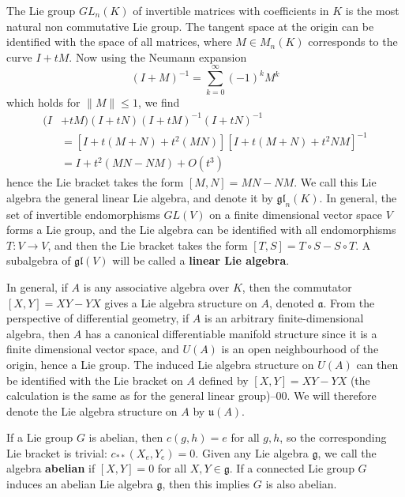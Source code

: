 \begin{example}
    The Lie group $GL_n(K)$ of invertible matrices with coefficients in $K$ is the most natural non commutative Lie group. The tangent space at the origin can be identified with the space of all matrices, where $M \in M_n(K)$ corresponds to the curve $I + tM$. Now using the Neumann expansion
    \[ (I + M)^{-1} = \sum_{k = 0}^\infty (-1)^k M^k \]
    which holds for $\| M \| \leq 1$, we find
    \begin{align*}
        (I& + tM)(I + tN)(I + tM)^{-1}(I + tN)^{-1}\\
        &= [I + t(M + N) + t^2(MN)][I + t(M + N) + t^2NM]^{-1}\\
        &= I + t^2(MN - NM) + O(t^3)
    \end{align*}
    hence the Lie bracket takes the form $[M,N] = MN - NM$. We call this Lie algebra the general linear Lie algebra, and denote it by $\mathfrak{gl}_n(K)$. In general, the set of invertible endomorphisms $GL(V)$ on a finite dimensional vector space $V$ forms a Lie group, and the Lie algebra can be identified with all endomorphisms $T: V \to V$, and then the Lie bracket takes the form $[T,S] = T \circ S - S \circ T$. A subalgebra of $\mathfrak{gl}(V)$ will be called a {\bf linear Lie algebra}.
\end{example}

\begin{example}
    In general, if $A$ is any associative algebra over $K$, then the commutator $[X,Y] = XY - YX$ gives a Lie algebra structure on $A$, denoted $\mathfrak{a}$. From the perspective of differential geometry, if $A$ is an arbitrary finite-dimensional algebra, then $A$ has a canonical differentiable manifold structure since it is a finite dimensional vector space, and $U(A)$ is an open neighbourhood of the origin, hence a Lie group. The induced Lie algebra structure on $U(A)$ can then be identified with the Lie bracket on $A$ defined by $[X,Y] = XY - YX$ (the calculation is the same as for the general linear group)--00. We will therefore denote the Lie algebra structure on $A$ by $\mathfrak{u}(A)$.
\end{example}

\begin{example}
    If a Lie group $G$ is abelian, then $c(g,h) = e$ for all $g,h$, so the corresponding Lie bracket is trivial: $c_{**}(X_e,Y_e) = 0$. Given any Lie algebra $\mathfrak{g}$, we call the algebra {\bf abelian} if $[X,Y] = 0$ for all $X,Y \in \mathfrak{g}$. If a connected Lie group $G$ induces an abelian Lie algebra $\mathfrak{g}$, then this implies $G$ is also abelian.
\end{example}

